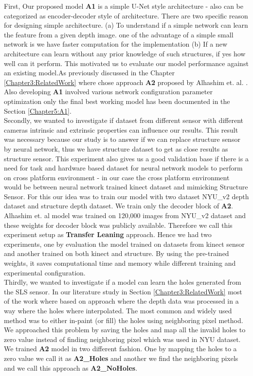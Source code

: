 First, Our proposed model \textbf{A1} is a simple U-Net style architecture - also can be categorized as encoder-decoder style of architecture. There are two specific reason for designing simple architecture. (a) To understand if a simple network can learn the feature from a given depth image. one of the advantage of a simple small network is we have faster computation for the implementation (b) If a new architecture can learn without any prior knowledge of such structures, if yes how well can it perform. This motivated us to evaluate our model performance against an existing model.As previously discussed in the Chapter \ref{Chapter3:RelatedWork}  where chose approach \textbf{A2} proposed by Alhashim et. al. \cite{Alhashim2018}. Also developing \textbf{A1} involved various network configuration parameter optimization only the final best working model has been documented in the Section \ref{Chapter5:A1}. \\

Secondly, we wanted to investigate if dataset from different sensor with different cameras intrinsic and extrinsic properties can influence our results.  This result was necessary because our study is to answer if we can replace structure sensor by neural network, thus we have structure dataset to get as close results as structure sensor. This experiment also gives us a good validation base if there is a need for task and hardware based dataset for neural network models to perform on cross platform environment - in our case  the cross platform environment would be between neural network trained kinect dataset and mimicking Structure Sensor. For this our idea was to train our model with two dataset NYU\_v2 depth dataset and structure depth dataset. We train only the decoder block of \textbf{A2}. Alhashim et. al \cite{Alhashim2018} model was trained on 120,000 images from NYU\_v2 dataset and these weights for decoder block was publicly available. Therefore we call this experiment setup as \textbf{Transfer Leaning} approach. Hence we had two experiments, one by evaluation the model trained on  datasets from kinect sensor and another trained on both kinect and structure. By using the pre-trained weights, it saves computational time and memory while different training and experimental configuration. \\

Thirdly, we wanted to investigate if a model can learn the holes generated from the SLS sensor. In our literature study in Section \ref{Chapter3:RelatedWork} most of the work where based on approach where the depth data was processed  in a way where the holes where interpolated. The most common and widely used method was to either in-paint (or fill) the holes using neighboring pixel \cite{silberman11indoor} method. We approached this problem by saving the holes and map all the invalid holes to zero value instead of finding neighboring pixel which was used in NYU dataset. We trained \textbf{A2} model in two different fashion. One by mapping the holes to a zero value we call it as \textbf{A2\_Holes} and another we find the neighboring pixels and we call this approach as \textbf{A2\_NoHoles}.

